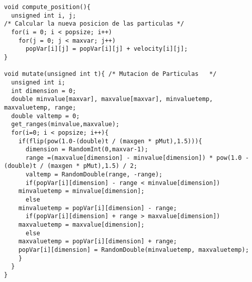 \begin{lstlisting}[style=C]
void compute_position(){
  unsigned int i, j;
/* Calcular la nueva posicion de las particulas */
  for(i = 0; i < popsize; i++)
    for(j = 0; j < maxvar; j++)
      popVar[i][j] = popVar[i][j] + velocity[i][j];
}

void mutate(unsigned int t){ /* Mutacion de Particulas	 */
  unsigned int i;
  int dimension = 0;
  double minvalue[maxvar], maxvalue[maxvar], minvaluetemp, maxvaluetemp, range;
  double valtemp = 0;
  get_ranges(minvalue,maxvalue);
  for(i=0; i < popsize; i++){
    if(flip(pow(1.0-(double)t / (maxgen * pMut),1.5))){
      dimension = RandomInt(0,maxvar-1);
      range =(maxvalue[dimension] - minvalue[dimension]) * pow(1.0 - (double)t / (maxgen * pMut),1.5) / 2;
      valtemp = RandomDouble(range, -range);
      if(popVar[i][dimension] - range < minvalue[dimension])
	minvaluetemp = minvalue[dimension];
      else
	minvaluetemp = popVar[i][dimension] - range;
      if(popVar[i][dimension] + range > maxvalue[dimension])
	maxvaluetemp = maxvalue[dimension];
      else
	maxvaluetemp = popVar[i][dimension] + range;
	popVar[i][dimension] = RandomDouble(minvaluetemp, maxvaluetemp);
    }
  }
}


\end{lstlisting}
